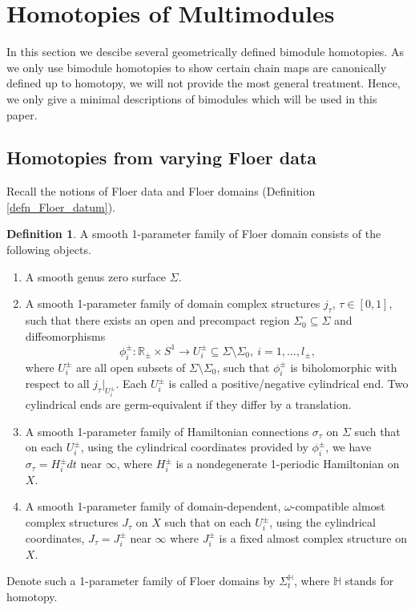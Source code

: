 \documentclass[reqno, 10pt]{amsart}
\numberwithin{equation}{section}
\numberwithin{equation}{section}
\renewcommand{\subset}{\subseteq}
\theoremstyle{definition}
\newtheorem{defn}[thm]{Definition}
\theoremstyle{remark}
\newcommand{\beqn}{\begin{equation*}}
\newcommand{\eeqn}{\end{equation*}}
\newcommand{\mb}{\mathbb}
\begin{document}
\section{Homotopies of Multimodules}\label{section_homotopy}

In this section we descibe several geometrically defined bimodule homotopies. As we only use bimodule homotopies to show certain chain maps are canonically defined up to homotopy, we will not provide the most general treatment. Hence, we only give a minimal descriptions of bimodules which will be used in this paper. 

\subsection{Homotopies from varying Floer data}

Recall the notions of Floer data and Floer domains (Definition \ref{defn_Floer_datum}).

\begin{defn}
A smooth 1-parameter family of Floer domain consists of the following objects. 
\begin{enumerate}

\item A smooth genus zero surface $\Sigma$.

\item A smooth 1-parameter family of domain complex structures $j_\tau$, $\tau \in [0, 1]$, such that there exists an open and precompact region $\Sigma_0 \subset \Sigma$ and diffeomorphisms
\beqn
\phi_i^\pm: {\mb R}_\pm \times S^1 \to U_i^\pm \subset \Sigma \setminus \Sigma_0,\ i = 1, \ldots, l_\pm,
\eeqn
where $U_i^\pm$ are all open subsets of $\Sigma \setminus \Sigma_0$, such that $\phi_i^\pm$ is biholomorphic with respect to all $j_\tau|_{U_i^\pm}$. Each $U_i^\pm$ is called a positive/negative cylindrical end. Two cylindrical ends are germ-equivalent if they differ by a translation.

\item A smooth 1-parameter family of Hamiltonian connections $\sigma_\tau$ on $\Sigma$ such that on each $U_i^\pm$, using the cylindrical coordinates provided by $\phi_i^\pm$, we have $\sigma_\tau = H_i^\pm dt$ near $\infty$, where $H_i^\pm$ is a nondegenerate 1-periodic Hamiltonian on $X$.

\item A smooth 1-parameter family of domain-dependent, $\omega$-compatible almost complex structures $J_\tau$ on $X$ such that on each $U_i^\pm$, using the cylindrical coordinates, $J_\tau = J_i^\pm$ near $\infty$ where $J_i^\pm$ is a fixed almost complex structure on $X$.
\end{enumerate}
Denote such a 1-parameter family of Floer domains by $\Sigma_t^{\mb H}$, where ${\mb H}$ stands for homotopy.
\end{defn}
\end{document}
